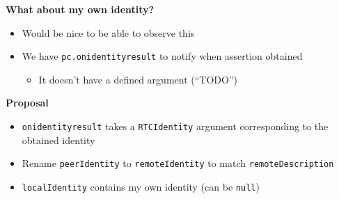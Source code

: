 \documentclass[helvetica]{seminar}
\newcommand{\heading}[1]{%
  \begin{center} 
    \large\bf 
    #1 
  \end{center} 
  \vspace{.4 in}}
\begin{document}
\begin{slide}
\heading{What about my own identity?}

\begin{itemize}
\item Would be nice to be able to observe this
\item We have \verb^pc.onidentityresult^ to notify when assertion obtained
  \begin{itemize}
    \item It doesn't have a defined argument (``TODO'')
  \end{itemize}
\end{itemize}
\end{slide}


\begin{slide}
\heading{Proposal}

\begin{itemize}
\item \verb^onidentityresult^ takes a \verb^RTCIdentity^ argument corresponding to the obtained identity
\item Rename \verb^peerIdentity^ to \verb^remoteIdentity^ to match \verb^remoteDescription^
\item \verb^localIdentity^ contains my own identity (can be \verb^null^)
\end{itemize}
\end{slide}
\end{document}
